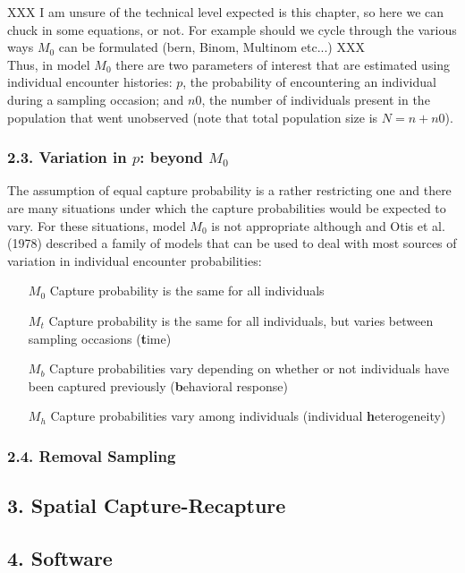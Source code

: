 \documentclass{book}
\begin{document}
XXX I am unsure of the technical level expected is this chapter, so here we can chuck in some equations, or not. For example should we cycle through the various ways $M_0$ can be formulated (bern, Binom, Multinom etc...) XXX\\

Thus, in model $M_0$ there are two parameters of interest that are estimated using individual encounter histories: $p$, the probability of encountering an individual during a sampling occasion; and $n0$, the number of individuals present in the population that went unobserved (note that total population size is $N = n + n0$).

\subsubsection*{2.3. Variation in $p$: beyond $M_0$}
The assumption of equal capture probability is a rather restricting one and there are many situations under which the capture probabilities would be expected to vary. For these situations, model $M_0$ is not appropriate although and Otis et al. (1978) described a family of models that can be used to deal with most sources of variation in individual encounter probabilities:

\begin{itemize}
\item[$M_0$] Capture probability is the same for all individuals
\item[$M_t$] Capture probability is the same for all individuals, but varies between sampling occasions (\textbf{t}ime)
\item[$M_b$] Capture probabilities vary depending on whether or not individuals have been captured previously (\textbf{b}ehavioral response)
\item[$M_h$] Capture probabilities vary among individuals (individual \textbf{h}eterogeneity)
\end{itemize}


\subsubsection*{2.4. Removal Sampling}


\subsection*{3. Spatial Capture-Recapture}

\subsection*{4. Software}
\end{document}
